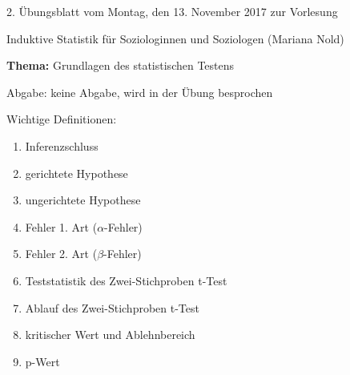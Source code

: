\documentclass[11pt]{article}
\newcommand{\VORLESUNG}{Induktive Statistik für Soziologinnen und Soziologen}
\newcommand{\STAFF}{Mariana Nold}
\newcommand{\ASSIGNMENT}{2}
\newcommand{\HANDOUT}{Montag, den 13. November   2017}
\newcommand{\DELIVER}{keine Abgabe, wird in der Übung besprochen}
\newcommand{\PRACTICAL}[1]{\marginpar{\tiny {\bf Aufgabe \\ abgeben!} #1}}
\newcommand{\titel}{Grundlagen des statistischen Testens}
\begin{document}

\begin{center}
\ASSIGNMENT{}. Übungsblatt vom \HANDOUT{} zur Vorlesung 
\vspace*{0.5cm}

{\Large \VORLESUNG{}}
(\STAFF{}) 


\vspace*{0.5cm}
{\textbf{Thema:} \titel{}\\}
\vspace*{0.2cm}

{\small Abgabe: \DELIVER{}}
\vspace*{1cm}
\end{center}

Wichtige Definitionen:
\begin{enumerate}
\item{Inferenzschluss}
\item{gerichtete Hypothese}
\item{ungerichtete Hypothese}
\item{Fehler 1. Art ($\alpha$-Fehler)}
\item{Fehler 2. Art ($\beta$-Fehler)}
\item{Teststatistik des Zwei-Stichproben t-Test}
\item{Ablauf des Zwei-Stichproben t-Test}
\item{kritischer Wert und Ablehnbereich}
\item{p-Wert}
\end{enumerate}
\vspace{2cm}
\end{document}
